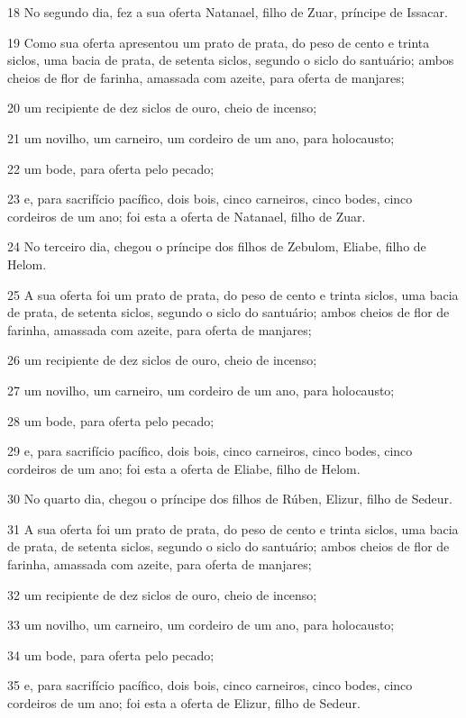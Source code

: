 \par 18 No segundo dia, fez a sua oferta Natanael, filho de Zuar, príncipe de Issacar.
\par 19 Como sua oferta apresentou um prato de prata, do peso de cento e trinta siclos, uma bacia de prata, de setenta siclos, segundo o siclo do santuário; ambos cheios de flor de farinha, amassada com azeite, para oferta de manjares;
\par 20 um recipiente de dez siclos de ouro, cheio de incenso;
\par 21 um novilho, um carneiro, um cordeiro de um ano, para holocausto;
\par 22 um bode, para oferta pelo pecado;
\par 23 e, para sacrifício pacífico, dois bois, cinco carneiros, cinco bodes, cinco cordeiros de um ano; foi esta a oferta de Natanael, filho de Zuar.
\par 24 No terceiro dia, chegou o príncipe dos filhos de Zebulom, Eliabe, filho de Helom.
\par 25 A sua oferta foi um prato de prata, do peso de cento e trinta siclos, uma bacia de prata, de setenta siclos, segundo o siclo do santuário; ambos cheios de flor de farinha, amassada com azeite, para oferta de manjares;
\par 26 um recipiente de dez siclos de ouro, cheio de incenso;
\par 27 um novilho, um carneiro, um cordeiro de um ano, para holocausto;
\par 28 um bode, para oferta pelo pecado;
\par 29 e, para sacrifício pacífico, dois bois, cinco carneiros, cinco bodes, cinco cordeiros de um ano; foi esta a oferta de Eliabe, filho de Helom.
\par 30 No quarto dia, chegou o príncipe dos filhos de Rúben, Elizur, filho de Sedeur.
\par 31 A sua oferta foi um prato de prata, do peso de cento e trinta siclos, uma bacia de prata, de setenta siclos, segundo o siclo do santuário; ambos cheios de flor de farinha, amassada com azeite, para oferta de manjares;
\par 32 um recipiente de dez siclos de ouro, cheio de incenso;
\par 33 um novilho, um carneiro, um cordeiro de um ano, para holocausto;
\par 34 um bode, para oferta pelo pecado;
\par 35 e, para sacrifício pacífico, dois bois, cinco carneiros, cinco bodes, cinco cordeiros de um ano; foi esta a oferta de Elizur, filho de Sedeur.
